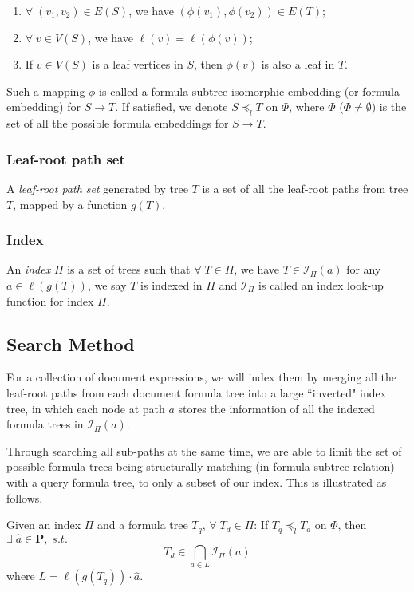 \documentclass{acm_proc_article-sp}
\begin{document}
\begin{enumerate}
\item 
$\forall\; (v_1,v_2) \in E(S)$, we have $(\phi(v_1),\phi(v_2)) \in E(T)$;
\item
$\forall\; v \in V(S)$, we have $\ell(v) = \ell(\phi(v))$;
\item
If $v \in V(S)$ is a leaf vertices in $S$, then $\phi(v)$ is also a leaf in $T$.
\end{enumerate}
Such a mapping $\phi$ is called a formula subtree isomorphic embedding (or formula embedding) for $S \rightarrow T$. 
If satisfied, we denote $S \preceq_l T$ on $\Phi$, where $\Phi$ ($\Phi \neq \emptyset$) is the set of all the possible formula embeddings for $S \rightarrow T$.

\subsubsection{Leaf-root path set}
A \textit{leaf-root path set} generated by tree $T$ is a set of all the leaf-root paths from tree $T$, mapped by a function $g(T)$. 

\subsubsection{Index}
An \textit{index} $\Pi$ is a set of trees such that $\forall\; T \in \Pi$, we have $T \in \mathcal{I}_{\Pi}(a)$ for any $a \in \ell(g(T))$, we say $T$ is indexed in $\Pi$ and $\mathcal{I}_{\Pi}$ is called an index look-up function for index $\Pi$. 

\subsection{Search Method}
\label{se-method}
For a collection of document expressions, we will index them by merging all the leaf-root paths from each document formula tree into a large ``inverted" index tree, 
in which each node at path $a$ stores the information of all the indexed formula trees in $\mathcal{I}_{\Pi}(a)$.

Through searching all sub-paths at the same time, we are able to limit the set of possible formula trees being structurally matching (in formula subtree relation) with a query formula tree, to only a subset of our index. 
This is illustrated as follows.

Given an index $\Pi$ and a formula tree $T_q$, $\forall\; T_d \in \Pi$:
If $T_q \preceq_l T_d$ on $\Phi$, then $\exists\; \hat{a} \in \mathbf{P},\; s.t.$
$$
T_d \in \bigcap_{a \in L} \mathcal{I}_{\Pi}(a)
$$
where $L = \ell(g(T_q)) \cdot \hat{a}$.
\end{document}
